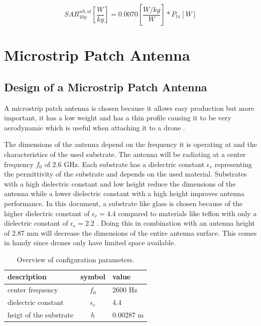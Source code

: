\begin{equation} 
SAR^{wb,ul}_{10g} \left[\frac{W}{kg}\right] = 0.0070 \left[\frac{W/kg}{W}\right] * P_{tx} [W]
\label{eq:ulToSar}
\end{equation}

\section{Microstrip Patch Antenna}
\subsection{Design of  a Microstrip Patch Antenna}
\label{sub:definingAntenna}
A microstrip patch antenna is chosen because it allows easy production but more important, it has a low weight 
and has a thin profile causing it to be very aerodynamic which is useful when attaching it to a drone \cite{J13_microstripadvantages}.

The dimensions of the antenna depend on the frequency it is operating at and the characteristics of the used substrate.
The antenna will be radiating at a center frequency $f_0$ of 2.6 GHz. Each substrate has a dielectric constant $\epsilon_r$ representing 
the permittivity of the substrate and depends on the used material.
Substrates with a high dielectric constant and low height 
reduce the dimensions of the antenna
while a lower dielectric constant with a high height improves antenna performance. 
In this document, a substrate like glass 
is chosen because of the higher dielectric constant of $\epsilon_r = 4.4$ compared to materials like teflon with only a dielectric 
constant of $\epsilon_r = 2.2$ \cite{J14_antennadesign}. 
Doing this in combination with an antenna height of 2.87 mm will decrease the dimensions of the entire antenna surface.
This comes in handy since drones only have limited space available.

\begin{table}[h!]
\centering
\begin{tabular}{|l|c|l|}
\hline
 description            & symbol          & value         \\    \hline
 center frequency       & $f_0$           & 2600 Hz       \\ 
 dielectric constant    & $\epsilon_r$    & 4.4         \\ 
 heigt of the substrate & $h$             & 0.00287 m    \\ \hline
\end{tabular}
\caption{Overview of configuration parameters.}
\label{table:antennaparas}
\end{table}

